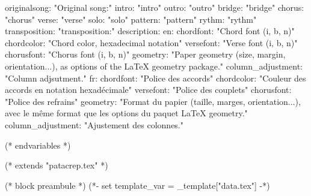       originalsong: "Original song:"
      intro: "intro"
      outro: "outro"
      bridge: "bridge"
      chorus: "chorus"
      verse: "verse"
      solo: "solo"
      pattern: "pattern"
      rythm: "rythm"
      transposition: "transposition:"
description:
  en:
    chordfont: "Chord font (i, b, n)"
    chordcolor: "Chord color, hexadecimal notation"
    versefont: "Verse font (i, b, n)"
    chorusfont: "Chorus font (i, b, n)"
    geometry: "Paper geometry (size, margin, orientation...), as options of the LaTeX geometry package."
    column_adjustment: "Column adjsutment."
  fr:
    chordfont: "Police des accords"
    chordcolor: "Couleur des accords en notation hexadécimale"
    versefont: "Police des couplets"
    chorusfont: "Police des refrains"
    geometry: "Format du papier (taille, marges, orientation...), avec le même format que les options du paquet LaTeX geometry."
    column_adjustment: "Ajustement des colonnes."


(* endvariables *)

(* extends "patacrep.tex" *)

(* block preambule *)
(*- set template_var = _template["data.tex"] -*)

\makeatletter
\renewcommand{\chorusfont}{%
   (* for letter in template_var.chorusfont *)
   (* if letter=="i" *)   \it %
   (* elif letter=='b' *)   \bf %
   (* elif letter=='n' *)   \normalfont %
   (* endif *)
   (* endfor *)
}

\def\@chordfont{%
   (* for letter in template_var.chordfont *)
   (* if letter=="i" *)   \it %
   (* elif letter=='b' *)   \bf %
   (* elif letter=='n' *)   \normalfont %
   (* endif *)
   (* endfor *)
}
\renewcommand{\printchord}[1]{\@chordfont\textcolor{ChordColor}{#1}}

\renewcommand{\lyricfont}{%
   (* for letter in template_var.versefont *)
   (* if letter=="i" *)   \it %
   (* elif letter=='b' *)   \bf %
   (* elif letter=='n' *)   \normalfont %
   (* endif *)
   (* endfor *)
}
\makeatother

\geometry{
 ((template_var.geometry))
}

\let\OldSongColumns=\songcolumns
\def\songcolumns#1{%
(* if template_var.column_adjustment=="only_one" *)
    \OldSongColumns{1}
(* elif template_var.column_adjustment=="one_more" *)
    \count0=#1\relax\advance\count0 by 1\relax%
    \OldSongColumns{\count0}
(* else *)
    \OldSongColumns{#1}
(* endif *)
}

